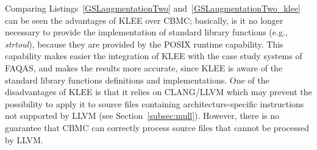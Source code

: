 Comparing Listings~\ref{GSLaugmentationTwo} and~\ref{GSLaugmentationTwo_klee} can be seen the advantages of KLEE over CBMC; basically, is it no longer necessary to provide the implementation of standard library functions (e.g., \emph{strtoul}), because they are provided by the POSIX runtime capability. This capability makes easier the integration of KLEE with the case study systems of FAQAS, and makes the results more accurate, since KLEE is aware of the standard library functions definitions and implementations. One of the disadvantages of KLEE is that it relies on CLANG/LLVM which may prevent the possibility to apply it to source files containing architecture-specific instructions not supported by LLVM (see Section~\ref{subsec:mull}). However, there is no guarantee that CBMC can correctly process source files that cannot be processed by LLVM.


